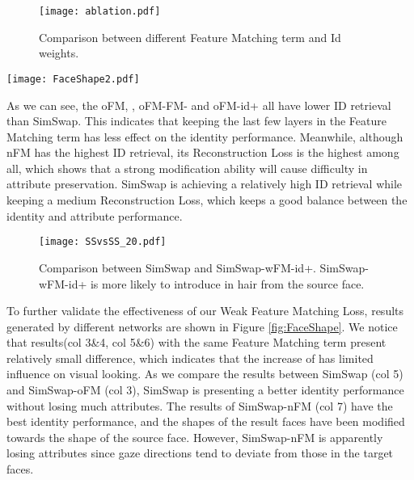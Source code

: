 \documentclass[sigconf]{acmart}
\begin{document}
\begin{figure}
\centering
\texttt{[image: ablation.pdf]}
\caption{Comparison between different Feature Matching term and Id weights.}
\label{fig:Ablation}
\end{figure}

\begin{figure*}[!ht] 
\centering
\texttt{[image: FaceShape2.pdf]}
\caption{Face swapping results generated by different networks. The results with original Feature Matching formulation(col 3\&4) exhibit a shortage of identity performance. The results with no Feature Matching term(col 7) have the best identity performance but suffer from attribute mismatch. The results with Weak Feature Matching Loss(col 5\&6) show a good balance between identity modification and attribute preservation.}
\label{fig:FaceShape}
\end{figure*}

As we can see, the oFM, , oFM-FM- and oFM-id+ all have lower ID retrieval than SimSwap. This indicates that keeping the last few layers in the Feature Matching term has less effect on the identity performance. Meanwhile, although nFM has the highest ID retrieval, its Reconstruction Loss is the highest among all, which shows that a strong modification ability will cause difficulty in attribute preservation. SimSwap is achieving a relatively high ID retrieval while keeping a medium Reconstruction Loss, which keeps a good balance between the identity and attribute performance.



\begin{figure}
\centering
\texttt{[image: SSvsSS\_20.pdf]}
\caption{Comparison between SimSwap and SimSwap-wFM-id+. SimSwap-wFM-id+ is more likely to introduce in hair from the source face.}
\label{fig:SS}
\end{figure}

To further validate the effectiveness of our Weak Feature Matching Loss, results generated by different networks are shown in Figure \ref{fig:FaceShape}. We notice that results(col 3\&4, col 5\&6) with the same Feature Matching term present relatively small difference, which indicates that the increase of  has limited influence on visual looking. As we compare the results between SimSwap (col 5) and SimSwap-oFM (col 3), SimSwap is presenting a better identity performance without losing much attributes. The results of SimSwap-nFM (col 7) have the best identity performance, and the shapes of the result faces have been modified towards the shape of the source face. However, SimSwap-nFM is apparently losing attributes since gaze directions tend to deviate from those in the target faces.
\end{document}
